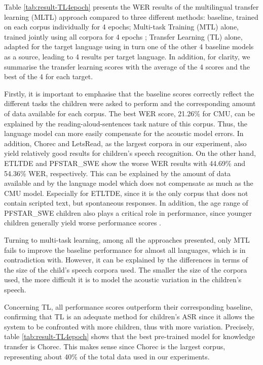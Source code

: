 Table \ref{tab:result-TL4epoch} presents the WER results of the multilingual transfer learning (MLTL) approach compared to three different methods: baseline, trained on each corpus individually for 4 epochs; Multi-task Training (MTL) alone, trained jointly using all corpora for 4 epochs
; Transfer Learning (TL) alone, adapted for the target language using in turn one of the other 4 baseline models as a source, leading to 4 results per target language. In addition, for clarity, we summarise the transfer learning scores with the average of the 4 scores and the best of the 4 for each target.

Firstly, it is important to emphasise that the baseline scores correctly reflect the different tasks the children were asked to perform and the corresponding amount of data available for each corpus. The best WER score, 21.26\% for CMU, can be explained by the reading-aloud-sentences task nature of this corpus. Thus, the language model can more easily compensate for the acoustic model errors. In addition, Chorec and LetsRead, as the largest corpora in our experiment, also yield relatively good results for children's speech recognition. On the other hand, ETLTDE and PFSTAR\_SWE show the worse WER results with 44.69\%  and 54.36\% WER, respectively. This can be explained by the amount of data available and by the language model which does not compensate as much as the CMU model. Especially for ETLTDE, since it is the only corpus that does not contain scripted text, but spontaneous responses. In addition, the age range of PFSTAR\_SWE children also plays a critical role in performance, since younger children generally yield worse performance scores \cite{TFchildren}.

Turning to multi-task learning, among all the approaches presented, only MTL fails to improve the baseline performance for almost all languages, which is in contradiction with\cite{TransferLF}.  However, it can be explained by the differences in terms of the size of the child's speech corpora used. The smaller the size of the corpora used, the more difficult it is to model the acoustic variation in the children's speech.


Concerning TL, all performance scores outperform their corresponding baseline, confirming that TL is an adequate method for children's ASR since it allows the system to be confronted with more children, thus with more variation. Precisely, table \ref{tab:result-TL4epoch} shows that the best pre-trained model for knowledge transfer is Chorec.
This makes sense since Chorec is the largest corpus, representing about 40\% of the total data used in our experiments.



